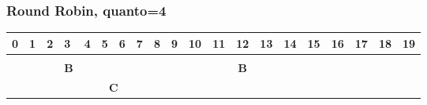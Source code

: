 \documentclass[a4paper]{article}
\begin{document}
\subsubsection{Round Robin, quanto=4}
\begin{table}[htb]
    \centering
    \label{my-label}
    \begin{tabular}{|l|l|l|l|l|l|l|l|l|l|l|l|l|l|l|l|l|l|l|l|}
        \hline
        0                                                        & 1 & 2 & 3                                                       & 4                                                       & 5 & 6                                                      & 7 & 8                                                       & 9 & 10                                                      & 11 & 12 & 13                                                     & 14 & 15                                             & 16 & 17                                                     & 18 & 19 \\ \hline
        \rowcolor[HTML]{FFFFFF}
        \multicolumn{3}{|c|}{\cellcolor[HTML]{656565}\textbf{A}} &   &   &                                                         &                                                         &   &                                                        &   &                                                         &   &                                                         &    &    &                                                        &    &                                                &    &                                                                  \\ \hline
        \rowcolor[HTML]{FFFFFF}
                                                                 &   &   & \multicolumn{1}{c|}{\cellcolor[HTML]{656565}\textbf{B}} &                                                         &   &                                                        &   &                                                         &   & \multicolumn{5}{c|}{\cellcolor[HTML]{656565}\textbf{B}} &    &    &                                                        &    &                                                                                                                        \\ \hline
        \rowcolor[HTML]{FFFFFF}
                                                                 &   &   &                                                         & \multicolumn{4}{c|}{\cellcolor[HTML]{656565}\textbf{C}} &   & \multicolumn{1}{c|}{\cellcolor[HTML]{FFFFFF}\textbf{}} &   & \multicolumn{1}{c|}{\cellcolor[HTML]{FFFFFF}\textbf{}}  &   &                                                         &    &    &                                                        &    &                                                &                                                                       \\ \hline

\end{tabular}
\end{table}
\end{document}
